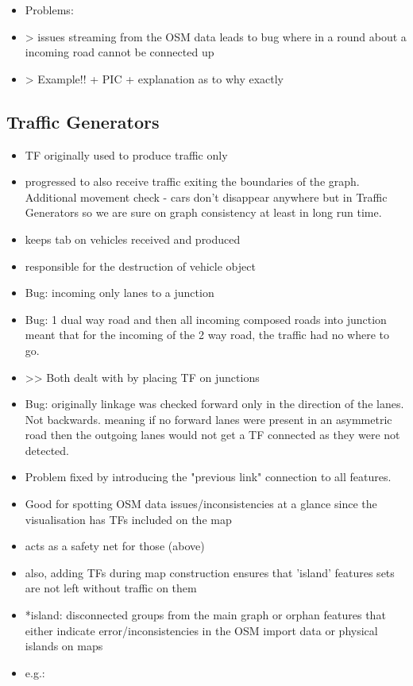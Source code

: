 \begin{itemize}
	\item Problems:
	\item > issues streaming from the OSM data leads to bug where in a round about a incoming road cannot be connected up
	\item > Example!! + PIC + explanation as to why exactly
\end{itemize}

\subsection{Traffic Generators}
\begin{itemize}
	\item TF originally used to produce traffic only
	\item progressed to also receive traffic exiting the boundaries of the graph. Additional movement check - cars don't disappear anywhere but in Traffic Generators so we are sure on graph consistency at least in long run time.
	\item keeps tab on vehicles received and produced
	\item responsible for the destruction of vehicle object
	\item Bug: incoming only lanes to a junction
	\item Bug: 1 dual way road and then all incoming composed roads into junction meant that for the incoming of the 2 way road, the traffic had no where to go.
	\item >> Both dealt with by placing TF on junctions
	\item Bug: originally linkage was checked forward only in the direction of the lanes. Not backwards. meaning if no forward lanes were present in an asymmetric road then the outgoing lanes would not get a TF connected as they were not detected.
	\item Problem fixed by introducing the "previous link" connection to all features.
	\item Good for spotting OSM data issues/inconsistencies at a glance since the visualisation has TFs included on the map
	\item acts as a safety net for those (above)
	\item also, adding TFs during map construction ensures that 'island' features sets are not left without traffic on them
	\item *island: disconnected groups from the main graph or orphan features that either indicate error/inconsistencies in the OSM import data or physical islands on maps
	\item e.g.: 
	

\end{itemize}
